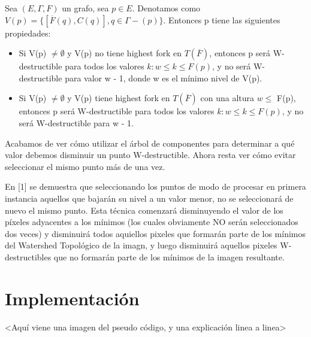 Sea  $(E,\Gamma,F)$  un grafo, sea $p \in E$. Denotamos como $V(p) = \{[\overline{F}(q),C(q)], q \in \Gamma-(p)\}$. Entonces p tiene las siguientes propiedades:
\begin{itemize}
  \item Si V(p) $\neq \emptyset$ y V(p) no tiene highest fork en $T(\overline{F})$, entonces p será W-destructible para todos los valores $k: w \leq k \leq F(p)$, y no será W-destructible para valor w - 1, donde w es el mínimo nivel de V(p).
  \item Si V(p) $\neq \emptyset$ y V(p) tiene highest fork en $T(\overline{F})$ con una altura $w \leq$ F(p), entonces p será W-destructible para todos los valores $k: w \leq k \leq F(p)$, y no será W-destructible para w - 1.
\end{itemize}
  
Acabamos de ver cómo utilizar el árbol de componentes para determinar a qué valor debemos disminuir un punto W-destructible. Ahora resta ver cómo evitar seleccionar el mismo punto más de una vez.

En [1] se demuestra que seleccionando los puntos de modo de procesar en primera instancia aquellos que bajarán su nivel a un valor menor, no se seleccionará de nuevo el mismo punto. Esta técnica comenzará disminuyendo el valor de los píxeles adyacentes a los mínimos (los cuales obviamente NO serán seleccionados dos veces) y disminuirá todos aquiellos pixeles que formarán parte de los mínimos del Watershed Topológico de la imagn, y luego disminuirá aquellos pixeles W-destructibles que no formarán parte de los mínimos de la imagen resultante.

  
\section{Implementación}

<Aquí viene una imagen del pseudo código, y una explicación linea a linea>

